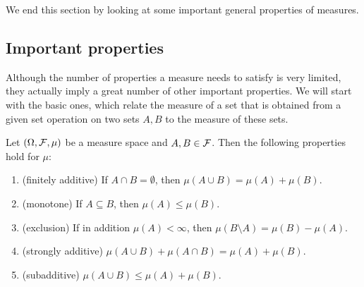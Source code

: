 We end this section by looking at some important general properties of measures.


\subsection{Important properties}

Although the number of properties a measure needs to satisfy is very limited, they actually imply a great number of other important properties. We will start with the basic ones, which relate the measure of a set that is obtained from a given set operation on two sets $A, B$ to the measure of these sets.

\begin{proposition}\label{prop:basic_properties_measures}
Let $(\Omega, \mathcal F, \mu)$ be a measure space and $A, B \in \mathcal F$. Then the following properties hold for $\mu$:
\begin{enumerate}
\item (finitely additive) If $A \cap B = \emptyset$, then $\mu(A \cup B) = \mu(A) + \mu(B)$.
\item (monotone) If $A \subseteq B$, then $\mu(A) \le \mu(B)$.
\item (exclusion) If in addition $\mu(A) < \infty$, then $\mu(B \setminus A) = \mu(B) - \mu(A)$.
\item (strongly additive) $\mu(A \cup B) + \mu(A \cap B) = \mu(A) + \mu(B)$.
\item (subadditive) $\mu(A \cup B) \le \mu(A) + \mu(B)$.
\end{enumerate}
\end{proposition}

